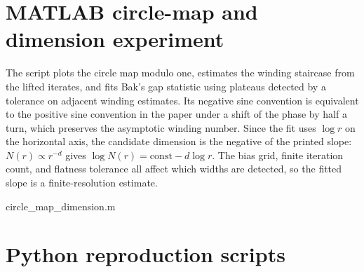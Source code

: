 \documentclass[11pt]{article}
\begin{document}
\clearpage
\appendix
\section{MATLAB circle-map and dimension experiment}
\label{app:matlab}

The script plots the circle map modulo one, estimates the winding staircase from the lifted iterates,
and fits Bak's gap statistic using plateaus detected by a tolerance on adjacent winding estimates.
Its negative sine convention is equivalent to the positive sine convention in the paper under a shift
of the phase by half a turn, which preserves the asymptotic winding number.
Since the fit uses $\log r$ on the horizontal axis, the candidate dimension is the negative of the
printed slope: $N(r)\propto r^{-d}$ gives $\log N(r)=\mathrm{const}-d\log r$.
The bias grid, finite iteration count, and flatness tolerance all affect which widths are detected,
so the fitted slope is a finite-resolution estimate.


  {circle_map_dimension.m}

\section{Python reproduction scripts}




\end{document}

